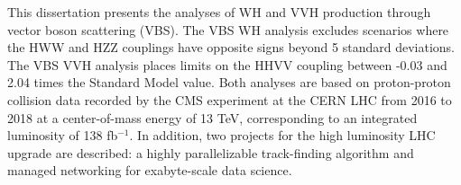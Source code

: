 \begin{dissertationabstract}
    This dissertation presents the analyses of WH and VVH production through vector boson scattering (VBS). 
    The VBS WH analysis excludes scenarios where the HWW and HZZ couplings have opposite signs beyond 5 standard deviations. 
    The VBS VVH analysis places limits on the HHVV coupling between -0.03 and 2.04 times the Standard Model value. 
    Both analyses are based on proton-proton collision data recorded by the CMS experiment at the CERN LHC from 2016 to 2018 at a center-of-mass energy of 13 TeV, corresponding to an integrated luminosity of 138 fb$^{-1}$. 
    In addition, two projects for the high luminosity LHC upgrade are described: a highly parallelizable track-finding algorithm and managed networking for exabyte-scale data science. 
\end{dissertationabstract}
